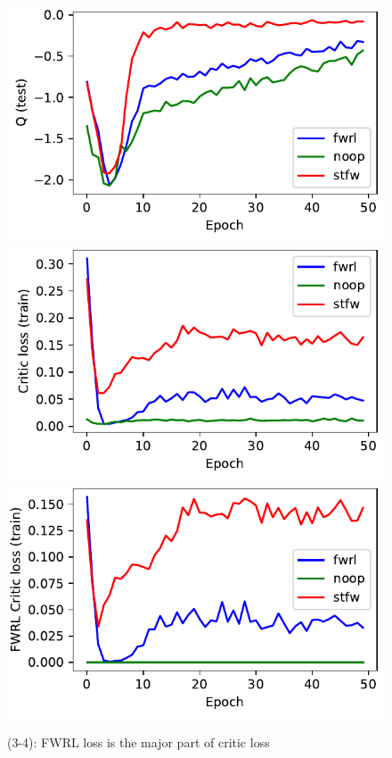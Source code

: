 \begin{figure}
  \includegraphics[width=\frac\columnwidth]{media/res/f0d4cfa-FetchReach-v1-stfw-none/test/mean_Q.pdf}%
  \includegraphics[width=\frac\columnwidth]{media/res/f0d4cfa-FetchReach-v1-stfw-none/train/critic_loss.pdf}%
  \includegraphics[width=\frac\columnwidth]{media/res/f0d4cfa-FetchReach-v1-stfw-none/train/critic_addnl_loss.pdf}\\
  \caption{
    (3-4): FWRL loss is the major part of critic loss}%
  \label{fig:fwrl-stepfwrl-noop-FetchReach}%
\end{figure}%
% 

